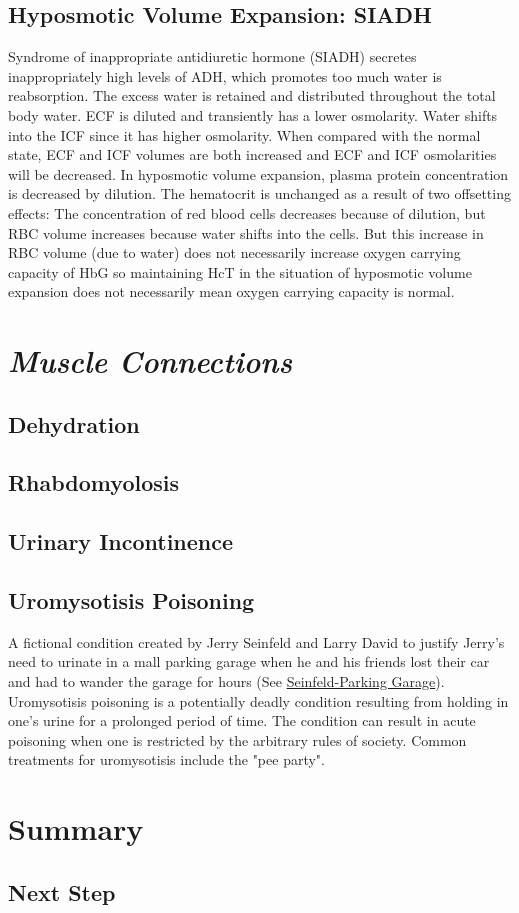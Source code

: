 \subsection{Hyposmotic Volume Expansion: SIADH} 

Syndrome of inappropriate antidiuretic hormone (SIADH) secretes inappropriately high levels of ADH, which promotes too much water is reabsorption. The excess water is retained and distributed throughout the total body water. ECF is diluted and transiently has a lower osmolarity. Water shifts into the ICF since it has higher osmolarity. When compared with the normal state, ECF and ICF volumes are both increased and ECF and ICF osmolarities will be decreased. In hyposmotic volume expansion, plasma protein concentration is decreased by dilution. The hematocrit is unchanged as a result of two offsetting effects: The concentration of red blood cells decreases because of dilution, but RBC volume increases because water shifts into the cells. But this increase in RBC volume (due to water) does not necessarily increase oxygen carrying capacity of HbG so maintaining HcT in the situation of hyposmotic volume expansion does not necessarily mean oxygen carrying capacity is normal.





\section{\textit{Muscle Connections}}

\subsection{Dehydration}

\subsection{Rhabdomyolosis}

\subsection{Urinary Incontinence}

\subsection{Uromysotisis Poisoning}

A fictional condition created by Jerry Seinfeld and Larry David to justify Jerry's need to urinate in a mall parking garage when he and his friends lost their car and had to wander the garage for hours (See \href{https://www.youtube.com/watch?v=OG6b7KJ1Ah0}{Seinfeld-Parking Garage}). Uromysotisis poisoning is a potentially deadly condition resulting from holding in one's urine for a prolonged period of time. The condition can result in acute poisoning when one is restricted by the arbitrary rules of society. Common treatments for uromysotisis include the "pee party".

\section{Summary}

\subsection{Next Step}

\printbibliography[heading=subbibintoc]